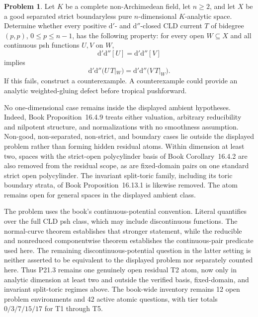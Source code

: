 \documentclass[11pt,a4paper]{article}
\theoremstyle{definition}
\newtheorem{problem}{Problem}[section]
\theoremstyle{remark}
\begin{document}
\begin{problem}
\label{prob:frontier-cross-fan-upstairs}
Let \(K\) be a complete non-Archimedean field, let \(n\geq2\), and let \(X\)
be a good separated strict boundaryless pure \(n\)-dimensional
\(K\)-analytic space.  Determine whether every positive
\(\mathrm d'\)- and \(\mathrm d''\)-closed CLD current \(T\) of bidegree
\((p,p)\), \(0\leq p\leq n-1\), has the following property: for every open
\(W\subseteq X\) and all continuous psh functions \(U,V\) on \(W\),
\begin{equation}
                  \mathrm d'\mathrm d''[U]
                  =\mathrm d'\mathrm d''[V]
 \label{eq:p21p3-post-nonreduced-residual-equal-curvature}
\end{equation}
implies
\begin{equation}
 \mathrm d'\mathrm d''\bigl(U\,T|_W\bigr)
 =\mathrm d'\mathrm d''\bigl(V\,T|_W\bigr).
 \label{eq:p21p3-post-nonreduced-residual-bt}
\end{equation}
If this fails, construct a counterexample.  A counterexample could provide an
analytic weighted-gluing defect before tropical pushforward.
\end{problem}

No one-dimensional case remains inside the displayed ambient hypotheses.
Indeed, Book Proposition~16.4.9 treats either
valuation, arbitrary reducibility and nilpotent structure, and normalizations
with no smoothness assumption.  Non-good, non-separated, non-strict, and
boundary cases lie outside the displayed problem rather than forming hidden
residual atoms.  Within dimension at least two, spaces with the strict-open
polycylinder basis of
Book Corollary~16.4.2 are also removed from the
residual scope, as are fixed-domain pairs on one standard strict open
polycylinder.  The invariant split-toric family, including its toric boundary
strata, of
Book Proposition~16.13.1 is likewise
removed.  The atom remains open for general spaces in the displayed ambient
class.


The problem uses the book's continuous-potential convention.  Literal
\cite[Definition~8.6.2]{CLD25} quantifies over the full CLD psh class, which
may include discontinuous functions.  The normal-curve theorem establishes
that stronger statement, while the reducible and nonreduced componentwise
theorem establishes the continuous-pair predicate used here.  The remaining
discontinuous-potential question in the latter setting is neither asserted to
be equivalent to the displayed problem nor separately counted here.  Thus
P21.3 remains one genuinely open residual T2 atom, now only in analytic
dimension at least two and outside the verified basis, fixed-domain, and
invariant split-toric regimes above.  The book-wide inventory remains
12 open problem environments and 42 active atomic questions, with
tier totals \(0/3/7/15/17\) for T1 through T5.
\end{document}

